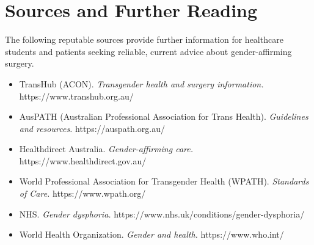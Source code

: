 \section*{Sources and Further Reading}
The following reputable sources provide further information for healthcare students and patients seeking reliable, current advice about gender-affirming surgery.
\begin{itemize}
    \item TransHub (ACON). \textit{Transgender health and surgery information.} https://www.transhub.org.au/
    \item AusPATH (Australian Professional Association for Trans Health). \textit{Guidelines and resources.} https://auspath.org.au/
    \item Healthdirect Australia. \textit{Gender-affirming care.} https://www.healthdirect.gov.au/
    \item World Professional Association for Transgender Health (WPATH). \textit{Standards of Care.} https://www.wpath.org/
    \item NHS. \textit{Gender dysphoria.} https://www.nhs.uk/conditions/gender-dysphoria/
    \item World Health Organization. \textit{Gender and health.} https://www.who.int/
\end{itemize}
